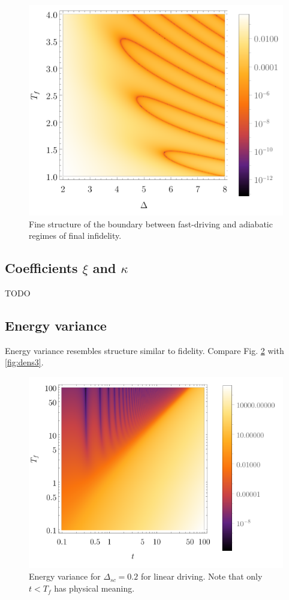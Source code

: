 \begin{figure}[H]
    \centering 
    \includegraphics[scale=1.2]{../img/dens2Zoom.pdf}
    \caption{Fine structure of the boundary between fast-driving and adiabatic regimes of final infidelity.}
    \label{fig:dens2Zoom}
\end{figure}


\subsection{Coefficients $\xi$ and $\kappa$}
TODO

\newpage
\subsection{Energy variance}
Energy variance resembles structure similar to fidelity. Compare Fig. \ref{fig:densVariance} with \ref{fig:dens3}. 
\begin{figure}[H]
    \centering
    \includegraphics[scale=1.2]{../img/densVariance.pdf}
    \caption{Energy variance for $\Delta_{sc}=0.2$ for linear driving. Note that only $t<T_f$ has physical meaning.}
    \label{fig:densVariance}
\end{figure}

